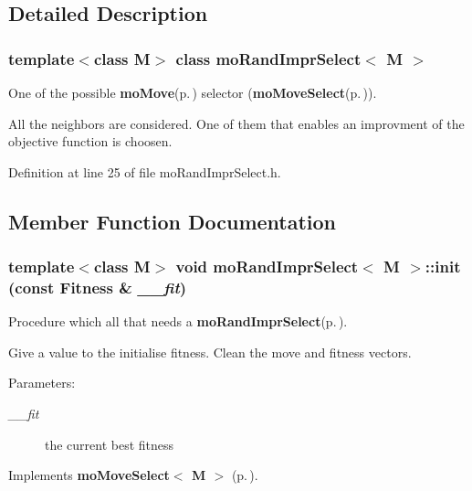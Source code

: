 \subsection{Detailed Description}
\subsubsection*{template$<$class M$>$ class mo\-Rand\-Impr\-Select$<$ M $>$}

One of the possible {\bf mo\-Move}{\rm (p.\,\pageref{classmo_move})} selector ({\bf mo\-Move\-Select}{\rm (p.\,\pageref{classmo_move_select})}). 

All the neighbors are considered. One of them that enables an improvment of the objective function is choosen. 



Definition at line 25 of file mo\-Rand\-Impr\-Select.h.

\subsection{Member Function Documentation}
\subsubsection{\setlength{\rightskip}{0pt plus 5cm}template$<$class M$>$ void {\bf mo\-Rand\-Impr\-Select}$<$ M $>$::init (const {\bf Fitness} \& {\em \_\-\_\-fit})\hspace{0.3cm}{\tt  [inline, virtual]}}\label{classmo_rand_impr_select_a19726a1509cff874801615d63a3b5d9}


Procedure which all that needs a {\bf mo\-Rand\-Impr\-Select}{\rm (p.\,\pageref{classmo_rand_impr_select})}. 

Give a value to the initialise fitness. Clean the move and fitness vectors.

\begin{Desc}
\item[Parameters:]
\begin{description}
\item[{\em \_\-\_\-fit}]the current best fitness \end{description}
\end{Desc}


Implements {\bf mo\-Move\-Select$<$ M $>$} {\rm (p.\,\pageref{classmo_move_select_bca4c43f13d26eca7163aeb272a4a52e})}.

